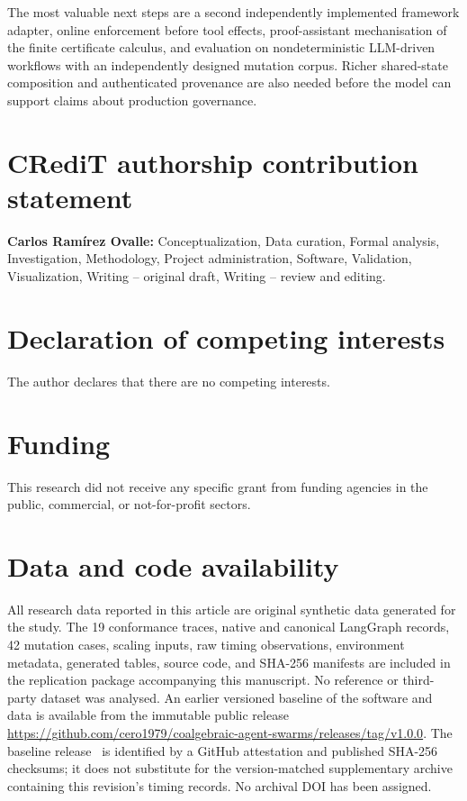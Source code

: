 \documentclass[a4paper,fleqn]{cas-sc}
\begin{document}
The most valuable next steps are a second independently implemented framework
adapter, online enforcement before tool effects, proof-assistant mechanisation
of the finite certificate calculus, and evaluation on nondeterministic
LLM-driven workflows with an independently designed mutation corpus. Richer
shared-state composition and authenticated provenance are also needed before
the model can support claims about production governance.


\section*{CRediT authorship contribution statement}
\textbf{Carlos Ram\'irez Ovalle:} Conceptualization, Data curation,
Formal analysis, Investigation, Methodology, Project administration, Software,
Validation, Visualization, Writing -- original draft, Writing -- review and
editing.

\printcredits

\section*{Declaration of competing interests}
The author declares that there are no competing interests.

\section*{Funding}
This research did not receive any specific grant from funding agencies
in the public, commercial, or not-for-profit sectors.

\section*{Data and code availability}
All research data reported in this article are original synthetic data generated
for the study. The 19 conformance traces, native and canonical LangGraph records,
42 mutation cases, scaling inputs, raw timing observations, environment
metadata, generated tables, source code, and SHA-256 manifests are included in
the replication package accompanying this manuscript. No reference or
third-party dataset was analysed. An earlier versioned baseline of the
software and data is available from the immutable public release
\url{https://github.com/cero1979/coalgebraic-agent-swarms/releases/tag/v1.0.0}.
The baseline release~\cite{artifact2026,artifactdata2026} is identified by a
GitHub attestation and published SHA-256 checksums; it does not substitute for
the version-matched supplementary archive containing this revision's timing
records. No archival DOI has been assigned.
\end{document}
